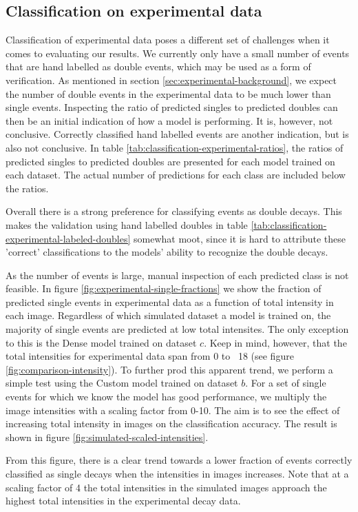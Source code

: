 \subsection{Classification on experimental data}
Classification of experimental data poses a different set of challenges when it comes
to evaluating our results. We currently only have a small number of events that are
hand labelled as double events, which may be used as a form of verification. As mentioned in section
\ref{sec:experimental-background}, we expect the number of double events in the experimental
data to be much lower than single events. Inspecting the ratio of predicted singles to predicted
doubles can then be an initial indication of how a model is performing. It is, however,
not conclusive. Correctly classified hand labelled events are another indication, but
is also not conclusive. In table \ref{tab:classification-experimental-ratios}, the ratios
of predicted singles to predicted doubles are presented for each model trained on each
dataset. The actual number of predictions for each class are included below the ratios.

Overall there is a strong preference for classifying events as double decays. This makes
the validation using hand labelled doubles in table \ref{tab:classification-experimental-labeled-doubles}
somewhat moot, since it is hard to attribute these 'correct' classifications to the models'
ability to recognize the double decays.


As the number of events is large, manual inspection of each predicted class is not feasible.
In figure \ref{fig:experimental-single-fractions} we show the fraction of predicted single events
in experimental data as a function of total intensity in each image. Regardless of which simulated
dataset a model is trained on, the majority of  single events are predicted at low total intensites.
The only exception to this is the Dense model trained on dataset $c$. Keep in mind, however, that the
total intensities for experimental data span from 0 to ~18 (see figure \ref{fig:comparison-intensity}).
To further prod this apparent trend, we perform a simple test using the Custom model trained on dataset $b$.
For a set of single events for which we know the model has good performance, we multiply the image intensities
with a scaling factor from 0-10. The aim is to see the effect of increasing total intensity in
images on the classification accuracy. The result is shown in figure \ref{fig:simulated-scaled-intensities}.

From this figure, there is a clear trend towards a lower fraction of events correctly classified as single 
decays when the intensities in images increases. Note that at a scaling factor of 4 the total intensities in
the simulated images approach the highest total intensities in the experimental decay data.
 

